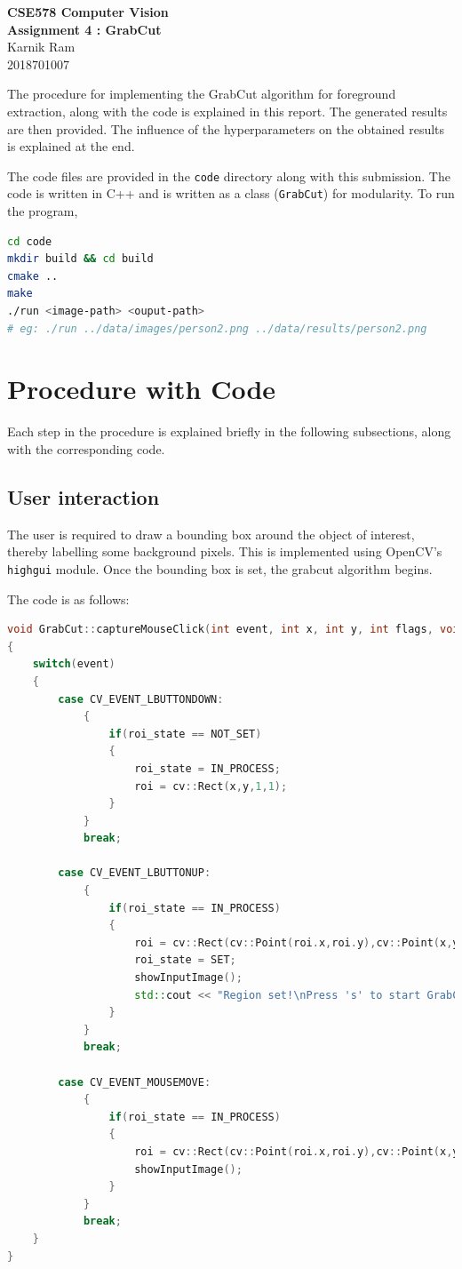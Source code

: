 \documentclass[a4paper,11]{article}
\begin{document}
\begin{center}
  \large{\textbf{CSE578 Computer Vision}}\\
  \Large{\textbf{Assignment 4 : GrabCut}}\\
  \vspace{1em}
  \large{Karnik Ram\\
  2018701007}
\end{center}

The procedure for implementing the GrabCut algorithm for foreground extraction, along with the code is explained in this report. The generated results are then provided. The influence of the hyperparameters on the obtained results is explained at the end.

The code files are provided in the \texttt{code} directory along with this submission. The code is written in C++ and is written as a class (\texttt{GrabCut}) for modularity. To run the program,

\begin{lstlisting}[language=bash]
cd code
mkdir build && cd build
cmake ..
make
./run <image-path> <ouput-path>
# eg: ./run ../data/images/person2.png ../data/results/person2.png
\end{lstlisting}

\section{Procedure with Code}
Each step in the procedure is explained briefly in the following subsections, along with the corresponding code.

  \subsection{User interaction}
  
  The user is required to draw a bounding box around the object of interest, thereby labelling some background pixels. This is implemented using OpenCV's \texttt{highgui} module. Once the bounding box is set, the grabcut algorithm begins.
  
  The code is as follows:
  \begin{lstlisting}[language=C++]
void GrabCut::captureMouseClick(int event, int x, int y, int flags, void *userdata)
{
	switch(event)
	{
		case CV_EVENT_LBUTTONDOWN:
			{
				if(roi_state == NOT_SET)
				{
					roi_state = IN_PROCESS;
					roi = cv::Rect(x,y,1,1);
				}
			}
			break;

		case CV_EVENT_LBUTTONUP:
			{
				if(roi_state == IN_PROCESS)
				{
					roi = cv::Rect(cv::Point(roi.x,roi.y),cv::Point(x,y));
					roi_state = SET;
					showInputImage();
					std::cout << "Region set!\nPress 's' to start GrabCut!\n";
				}
			}
			break;

		case CV_EVENT_MOUSEMOVE:
			{
				if(roi_state == IN_PROCESS)
				{
					roi = cv::Rect(cv::Point(roi.x,roi.y),cv::Point(x,y));
					showInputImage();
				}
			}
			break;
	}
}
  \end{lstlisting}
\end{document}
